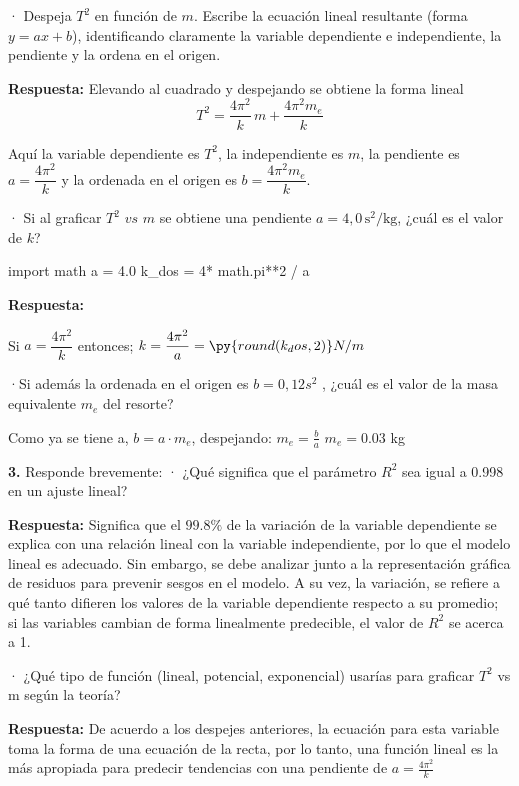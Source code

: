 · Despeja $T^2$ en función de $m$. Escribe la ecuación lineal resultante (forma $y=ax+b$),
identificando claramente la variable dependiente e independiente, la pendiente y la
ordena en el origen.


\textbf{Respuesta:}
Elevando al cuadrado y despejando se obtiene la forma lineal
\begin{equation}
    T^2 = \frac{4\pi^2}{k}\,m + \frac{4\pi^2 m_e}{k}
\end{equation}

Aquí la variable dependiente es $T^2$, la independiente es $m$, la pendiente es
$a=\dfrac{4\pi^2}{k}$ y la ordenada en el origen es $b=\dfrac{4\pi^2 m_e}{k}$.


 · Si al graficar $T^2$ $vs$ $m$ se obtiene una pendiente $a = 4,0\,\mathrm{s^2/kg}$, 
 ¿cuál es el valor de $k$?

 \begin{pycode}

import math
a = 4.0
k_dos = 4* math.pi**2 / a

 \end{pycode}


\textbf{Respuesta:}

Si $a=\dfrac{4\pi^2}{k}$ entonces; $k=\dfrac{4\pi^2}{a} =
\py{round(k_dos, 2)} N/m$
 
 ·Si además la ordenada en el origen es $b = 0,12 s^ 2$ , ¿cuál es el valor de la masa equivalente
$m_e$ del resorte?

Como ya se tiene a, $b = a \cdot m_e$, despejando: $m_e= \frac{b}{a}$
$m_e = 0.03$ kg


 \textbf{3.} Responde brevemente:
 · ¿Qué significa que el parámetro $R^2$ sea igual a 0.998 en un ajuste lineal?


\textbf{Respuesta:} Significa que el $99.8\%$ de la variación de la 
variable dependiente se explica con una relación lineal con la 
variable independiente, por lo que el modelo lineal es adecuado. Sin
embargo, se debe analizar junto a la representación gráfica de residuos
para prevenir sesgos en el modelo. A su vez, la variación, se refiere
 a qué tanto difieren los valores de la variable dependiente 
respecto a su promedio; si las variables cambian de forma 
linealmente predecible, el valor de $R^2$ se acerca a 1. 

 · ¿Qué tipo de función (lineal, potencial, exponencial)
usarías para graficar $T^2$ vs m según
la teoría?

\textbf{Respuesta:}
De acuerdo a los despejes anteriores, la ecuación para 
esta variable toma la forma de una ecuación de la recta, 
por lo tanto, una función lineal es la más apropiada para 
predecir tendencias con una pendiente de $a = \frac{4\pi^2}{k}$

